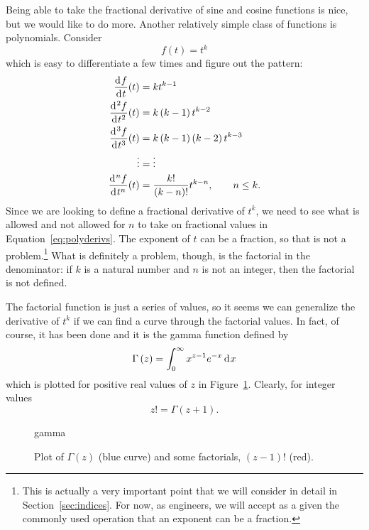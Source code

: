 Being able to take the fractional derivative of sine and cosine functions is nice, but we would like to do more. Another relatively simple class of functions is polynomials. Consider 
\begin{equation}
  f(t) = t^k
  \label{eq:poly}
\end{equation}
which is easy to differentiate a few times and figure out the pattern:
\begin{align}
  \frac{\operatorname{d}\hspace*{-1pt} f}{\operatorname{d}\hspace*{-1pt} t}(t) &= k t^{k-1} \\
  \frac{\operatorname{d}\hspace*{-1pt}^2 f}{\operatorname{d}\hspace*{-1pt} t^2}(t) &= k \left( k-1 \right) t^{k-2} \\
  \frac{\operatorname{d}\hspace*{-1pt}^3 f}{\operatorname{d}\hspace*{-1pt} t^3}(t) &= k \left( k-1 \right) \left( k - 2 \right) t^{k-3} \\
  \vdots &= \vdots \\
  \frac{\operatorname{d}\hspace*{-1pt}^n f}{\operatorname{d}\hspace*{-1pt} t^n}(t) &= \frac{k!}{\left( k - n \right)!} t^{k-n}, \qquad n \leq k.
  \label{eq:polyderivs}
\end{align}
Since we are looking to define a fractional derivative of $t^k$, we need to see
what is allowed and not allowed for $n$ to take on fractional values in
Equation~\ref{eq:polyderivs}. The exponent of $t$ can be a fraction, so that is
not a problem.\footnote{This is actually a very important point that we will
consider in detail in Section~\ref{sec:indices}. For now, as engineers, we will
accept as a given the commonly used operation that an exponent can be a
fraction.} What is definitely a problem, though, is the factorial in the
denominator: if $k$ is a natural number and $n$ is not an integer, then the
factorial is not defined.

The factorial function is just a series of values, so it seems we can generalize
the derivative of $t^k$ if we can find a curve through the factorial values. In
fact, of course, it has been done and it is the gamma function defined by
\begin{equation}
  \Gamma\left(z\right) = \int_0^\infty x^{z - 1} e^{-x} \operatorname{d}\hspace*{-1pt} x
  \label{eq:gamma}
\end{equation}
which is plotted for positive real values of $z$ in Figure~\ref{fig:gamma}. Clearly, for integer values
\begin{equation}
  z! = \Gamma\left( z + 1 \right).
\end{equation}

\begin{figure}
  \centering
  {gamma}
  \caption{Plot of $\Gamma(z)$ (blue curve) and some factorials, $\left(z - 1\right)!$ (red).}
  \label{fig:gamma}
\end{figure}

